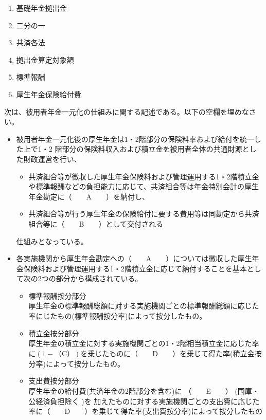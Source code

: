 \begin{answerbox}
  \begin{enumerate}[A: ]
    \item 基礎年金拠出金
    \item 二分の一
    \item 共済各法
    \item 拠出金算定対象額
    \item 標準報酬
    \item 厚生年金保険給付費
  \end{enumerate}
\end{answerbox}

\begin{fillblank}[年金2 H28 問題1(4)]
  次は、被用者年金一元化の仕組みに関する記述である。以下の空欄を埋めなさい。

  \begin{itemize}
    \item 被用者年金一元化後の厚生年金は1・2階部分の保険料率および給付を統一した上で1・2 階部分の保険料収入および積立金を被用者全体の共通財源とした財政運営を行い、
    \begin{itemize}
      \item 共済組合等が徴収した厚生年金保険料および管理運用する1・2階積立金や標準報酬などの負担能力に応じて、共済組合等は年金特別会計の厚生年金勘定に（　　A　　）を納付し、
      \item 共済組合等が行う厚生年金の保険給付に要する費用等は同勘定から共済組合等に（　　B　　）として交付される

    \end{itemize}
    仕組みとなっている。

    \;

    \item 各実施機関から厚生年金勘定への（　　A　　）については徴収した厚生年金保険料および管理運用する1・2階積立金に応じて納付することを基本として次の2つの部分から構成されている。
    \begin{itemize}
      \item 標準報酬按分部分 \\
      厚生年金の標準報酬総額に対する実施機関ごとの標準報酬総額に応じた率にじたもの(標準報酬按分率)によって按分したもの。
      \item 積立金按分部分 \\
      厚生年金の積立金に対する実施機関ごとの1・2階相当積立金に応じた率に$( 1- （　　\text{C}　　） )$を乗じたものに（　　D　　）を乗じて得た率(積立金按分率)によって按分したもの。
      \item 支出費按分部分 \\
      厚生年金の給付費(共済年金の2階部分を含む)に （　　E　　） (国庫・公経済負担除く )を 加えたものに対する実施機関ごとの支出費に応じた率に（　　D　　）を乗じて得た率(支出費按分率)によって按分したもの
    \end{itemize}
    
  \end{itemize}
\end{fillblank}

